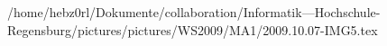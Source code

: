 /home/hebz0rl/Dokumente/collaboration/Informatik---Hochschule-Regensburg/pictures/pictures/WS2009/MA1/2009.10.07-IMG5.tex